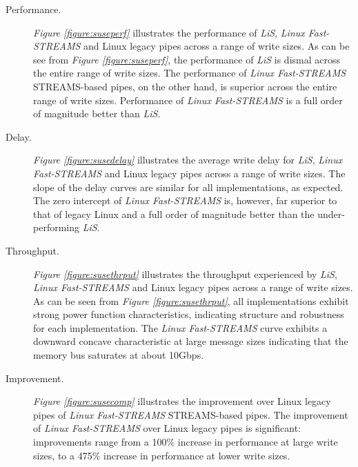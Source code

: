 \documentclass[letterpaper,final,notitlepage,twocolumn,10pt,twoside]{article}
\begin{document}
\begin{description}

\item[Performance.]

\textit{Figure \ref{figure:suseperf}} illustrates the performance of
\textsl{LiS}, \textsl{Linux Fast-STREAMS} and Linux legacy pipes across a
range of write sizes.  As can be see from \textit{Figure
\ref{figure:suseperf}}, the performance of \textsl{LiS} is dismal across the
entire range of write sizes.  The performance of \textsl{Linux Fast-STREAMS}
STREAMS-based pipes, on the other hand, is superior across the entire range of
write sizes.
Performance of \textsl{Linux Fast-STREAMS} is a full order of magnitude better
than \textsl{LiS}.

\item[Delay.]

\textit{Figure \ref{figure:susedelay}} illustrates the average write delay for
\textsl{LiS}, \textsl{Linux Fast-STREAMS} and Linux legacy pipes across a
range of write sizes.  The slope of the delay curves are similar for all
implementations, as expected.  The zero intercept of \textsl{Linux
Fast-STREAMS} is, however, far superior to that of legacy Linux and a full
order of magnitude better than the under-performing \textsl{LiS}.

\item[Throughput.]

\textit{Figure \ref{figure:susethrput}} illustrates the throughput experienced
by \textsl{LiS}, \textsl{Linux Fast-STREAMS} and Linux legacy pipes across a
range of write sizes.  As can be seen from \textit{Figure
\ref{figure:susethrput}}, all implementations exhibit strong power function
characteristics, indicating structure and robustness for each implementation.
The \textsl{Linux Fast-STREAMS} curve exhibits a downward concave
characteristic at large message sizes indicating that the memory bus saturates
at about 10Gbps.

\item[Improvement.]

\textit{Figure \ref{figure:susecomp}} illustrates the improvement over Linux
legacy pipes of \textsl{Linux Fast-STREAMS} STREAMS-based pipes.  The
improvement of \textsl{Linux Fast-STREAMS} over Linux legacy pipes is
significant: improvements range from a 100\% increase in performance at large
write sizes, to a 475\% increase in performance at lower write sizes.

\end{description}
\end{document}
